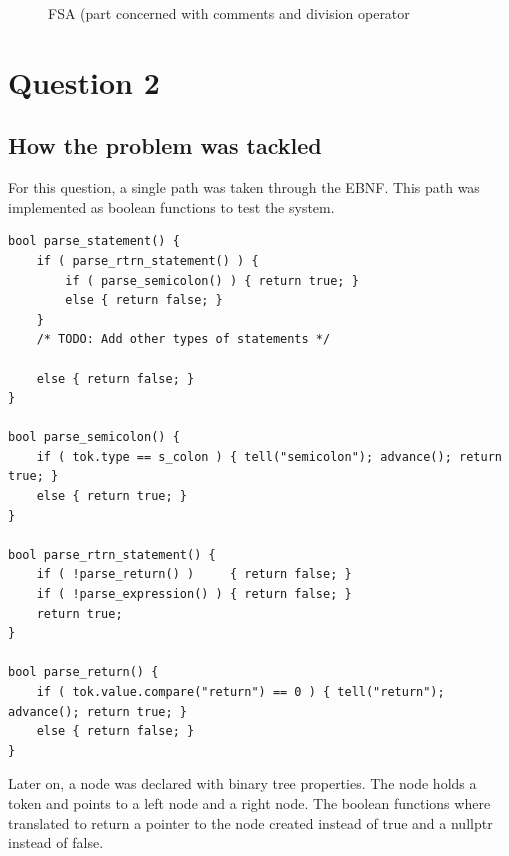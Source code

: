 \documentclass[a4paper, 12pt]{article}
\begin{document}
\begin{figure}[h]
    \centering
    \caption{FSA (part concerned with comments and division operator}
\end{figure}

\section{Question 2}
\subsection{How the problem was tackled}
For this question, a single path was taken through the EBNF. This path was implemented as boolean functions to test the system.

\begin{lstlisting}[caption="Initial boolean functions"]
bool parse_statement() {
    if ( parse_rtrn_statement() ) {
        if ( parse_semicolon() ) { return true; }
        else { return false; }
    }
    /* TODO: Add other types of statements */

    else { return false; }
}

bool parse_semicolon() {
    if ( tok.type == s_colon ) { tell("semicolon"); advance(); return true; }
    else { return true; }
}

bool parse_rtrn_statement() {
    if ( !parse_return() )     { return false; }
    if ( !parse_expression() ) { return false; }
    return true;
}

bool parse_return() {
    if ( tok.value.compare("return") == 0 ) { tell("return"); advance(); return true; }
    else { return false; }
}
\end{lstlisting}

Later on, a node was declared with binary tree properties. The node holds a token and points to a left node and a right node.
The boolean functions where translated to return a pointer to the node created instead of true and a nullptr instead of false.
\end{document}
